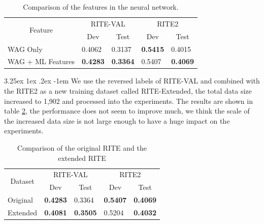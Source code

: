\documentclass[12pt]{article}
\makeatletter
\renewcommand\paragraph{\@startsection{paragraph}{5}{\z@}%
  {3.25ex \@plus1ex \@minus.2ex}%
  {-1em}%
  {\normalfont\normalsize\bfseries}}
\makeatother
\begin{document}
\begin{CJK*}{UTF8}{bkai}
\begin{spacing}{1.77}
\begin{table}[H]
  \centering
  \setlength{\extrarowheight}{-3pt}
  \caption{Comparison of the features in the neural network.}
  \label{result:csa_nn}
  \begin{tabular}{|l|l|l|l|l|}
  \hline
  \multicolumn{1}{|c|}{\multirow{2}{*}{Feature}} & \multicolumn{2}{c|}{RITE-VAL} & \multicolumn{2}{c|}{RITE2} \\ \cline{2-5}
  \multicolumn{1}{|c|}{} & \multicolumn{1}{c|}{Dev} & \multicolumn{1}{c|}{Test} & \multicolumn{1}{c|}{Dev} & \multicolumn{1}{c|}{Test} \\ \hline
  WAG Only & 0.4062 & 0.3137 & \textbf{0.5415} & 0.4015 \\ \hline
  WAG   + ML Features & \textbf{0.4283} & \textbf{0.3364} & 0.5407 & \textbf{0.4069} \\ \hline
  \end{tabular}
\end{table}

\paragraph{}
We use the reversed labels of RITE-VAL and combined with the RITE2 as a new training dataset called RITE-Extended, the total data size increased to 1,902 and processed into the experiments. The results are shown in table \ref{result:rite_extended}, the performance does not seem to improve much, we think the scale of the increased data size is not large enough to have a huge impact on the experiments.

\begin{table}[H]
  \centering
  \setlength{\extrarowheight}{-3pt}
  \caption{Comparison of the original RITE and the extended RITE}
  \label{result:rite_extended}
  \begin{tabular}{|l|l|l|l|l|}
  \hline
  \multicolumn{1}{|c|}{\multirow{2}{*}{Dataset}} & \multicolumn{2}{c|}{RITE-VAL} & \multicolumn{2}{c|}{RITE2} \\ \cline{2-5}
  \multicolumn{1}{|c|}{} & \multicolumn{1}{c|}{Dev} & \multicolumn{1}{c|}{Test} & \multicolumn{1}{c|}{Dev} & \multicolumn{1}{c|}{Test} \\ \hline
  Original & \textbf{0.4283} & 0.3364 & \textbf{0.5407} & \textbf{0.4069} \\ \hline
  Extended & \textbf{0.4081} & \textbf{0.3505} & 0.5204 & \textbf{0.4032} \\ \hline
  \end{tabular}
\end{table}


\end{spacing}
\end{CJK*}
\end{document}

